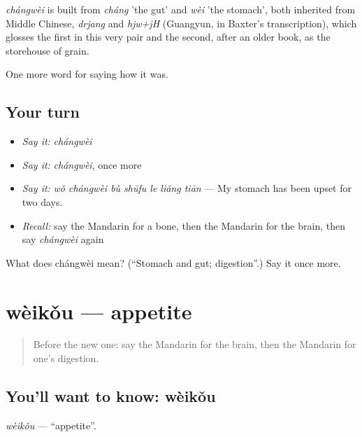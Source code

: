 \begin{cousinweb}
\emph{chángwèi} is built from \emph{cháng} 'the gut' and \emph{wèi} 'the stomach', both inherited from Middle Chinese, \emph{drjang} and \emph{hjw+jH} (Guangyun, in Baxter's transcription), which glosses the first in this very pair and the second, after an older book, as the storehouse of grain.
\end{cousinweb}

\begin{grammarlens}[title={What you've built}]
One more word for saying how it was.
\end{grammarlens}

\subsection*{Your turn}
\begin{itemize}
\raggedright
  \item \emph{Say it:} \emph{chángwèi}
  \item \emph{Say it:} \emph{chángwèi}, once more
  \item \emph{Say it:} \emph{wǒ chángwèi bù shūfu le liǎng tiān} — My stomach has been upset for two days.
  \item \emph{Recall:} say the Mandarin for a bone, then the Mandarin for the brain, then say \emph{chángwèi} again
\end{itemize}

\begin{tcolorbox}[breakable,colback=teal!4,colframe=teal!35!black,title={Before you move on}]
What does chángwèi mean? (\textquotedblleft{}Stomach and gut; digestion\textquotedblright{}.) Say it once more.
\end{tcolorbox}
\section[wèikǒu]{wèikǒu — appetite}

\label{lesson:ZH-C477-weikou}



\begin{quote}
Before the new one: say the Mandarin for the brain, then the Mandarin for one's digestion.
\end{quote}

\subsection*{You'll want to know: wèikǒu}
\emph{wèikǒu} — \textquotedblleft{}appetite\textquotedblright{}.

